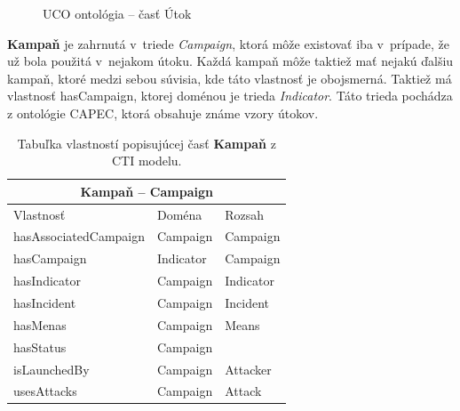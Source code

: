 \documentclass[12pt, a4paper, oneside]{book}
\begin{document}
\begin{figure}[!hb]
\label{fig:ucoUtok}
\caption{UCO ontológia -- časť Útok}
\end{figure}

\textbf{Kampaň} je zahrnutá v~triede \textit{Campaign}, ktorá môže existovať iba v~prípade, že už bola použitá v~nejakom útoku. Každá kampaň môže taktiež mať nejakú ďalšiu kampaň, ktoré medzi sebou súvisia, kde táto vlastnosť je obojsmerná. Taktiež má vlastnosť hasCampaign, ktorej doménou je trieda \textit{Indicator}. Táto trieda pochádza z ontológie CAPEC, ktorá obsahuje známe vzory útokov.
\begin{table}[hbt!]
\centering
\begin{tabular}{ |p{5cm}||p{3cm}|p{3cm}|  }
 \hline
 \multicolumn{3}{|c|}{Kampaň -- Campaign} \\
 \hline
 Vlastnosť & Doména & Rozsah\\
 \hline
 hasAssociatedCampaign & Campaign & Campaign\\
 hasCampaign & Indicator & Campaign\\
 hasIndicator & Campaign & Indicator\\
 hasIncident & Campaign & Incident\\
 hasMenas & Campaign & Means\\
 hasStatus & Campaign & \\
 isLaunchedBy & Campaign & Attacker\\
 usesAttacks & Campaign & Attack\\
 \hline
\end{tabular}
\caption{Tabuľka vlastností popisujúcej časť \textbf{Kampaň} z CTI modelu.}
\label{tab:template}
\end{table}
\end{document}
